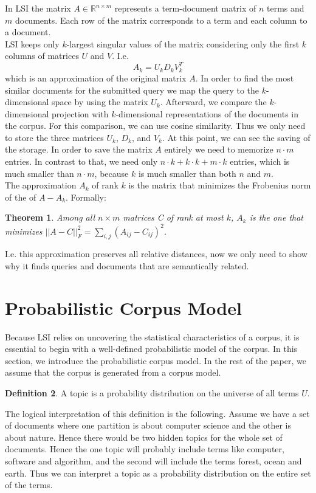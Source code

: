 \documentclass[a4paper,11pt,DIV=15]{scrartcl} %
\theoremstyle{plain}
\newtheorem{theorem}{Theorem}
\theoremstyle{definition}
\newtheorem{definition}[theorem]{Definition}
\begin{document}
In LSI the matrix $A \in \mathbb{R}^{n \times m}$ represents a term-document matrix of $n$ terms and $m$ documents. Each row of the matrix corresponds to a term and each column to a document.\\
LSI keeps only $k$-largest singular values of the matrix considering only the first $k$ columns of matrices $U$ and $V$. I.e.
\[
A_k = U_kD_kV_k^T
\]
which is an approximation of the original matrix $A$. 
In order to find the most similar documents for the submitted query we map the query to the $k$-dimensional space by using the matrix $U_k$. Afterward, we compare the $k$-dimensional projection with $k$-dimensional representations of the documents in the corpus. For this comparison, we can use cosine similarity. Thus we only need to store the three matrices $U_k$, $D_k$, and $V_k$.
At this point, we can see the saving of the storage. In order to save the matrix $A$ entirely we need to memorize $n \cdot m$ entries. In contrast to that, we need only $n \cdot k + k\cdot k + m \cdot k$ entries, which is much smaller than  $n \cdot m$, because $k$ is much smaller than both $n$ and $m$.\\
The approximation $A_k$ of rank $k$ is the matrix that minimizes the Frobenius norm of the of $A - A_k$. Formally:
\begin{theorem}
	\cite{EckartYoung} Among all $n \times m$ matrices C of rank at most $k$, $A_k$ is the one that minimizes $||A - C||_F^2 = \sum_{i,j}(A_{ij} - C_{ij})^2$.
\end{theorem}
I.e. this approximation preserves all relative distances, now we only need to show why it finds queries and documents that are semantically related.








 

\section{Probabilistic Corpus Model} %
Because LSI relies on uncovering the statistical characteristics of a corpus, it is essential to begin with a well-defined probabilistic model of the corpus.
In this section, we introduce the probabilistic corpus model.
In the rest of the paper, we assume that the corpus is generated from a corpus model.
\begin{definition}
A topic is a probability distribution on the universe of all terms $U$.
\end{definition}
The logical interpretation of this definition is the following. Assume we have a set of documents where one partition is about computer science and the other is about nature. Hence there would be two hidden topics for the whole set of documents.
Hence the one topic will probably include terms like computer, software and algorithm, and the second will include the terms forest, ocean and earth. Thus we can interpret a topic as a probability distribution on the entire set of the terms.
\end{document}
